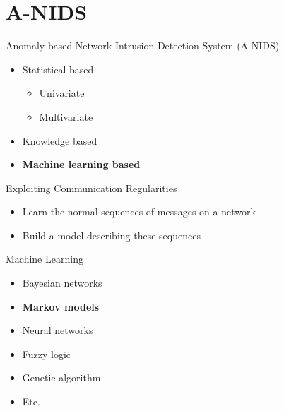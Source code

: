 \section{A-NIDS}

\begin{frame}Anomaly based Network Intrusion Detection System (A-NIDS)

\begin{itemize}
	\item Statistical based
		\begin{itemize}
			\item Univariate
			\item Multivariate
		\end{itemize}
	\item Knowledge based
	\item \textbf{Machine learning based}
\end{itemize}

Exploiting Communication Regularities

\begin{itemize}
	\item Learn the normal sequences of messages on a network
	\item Build a model describing these sequences
\end{itemize}
\end{frame}

\begin{frame}Machine Learning

\begin{itemize}
	\item Bayesian networks
	\item \textbf{Markov models}
	\item Neural networks
	\item Fuzzy logic
	\item Genetic algorithm
	\item Etc.
\end{itemize}	
\end{frame}



